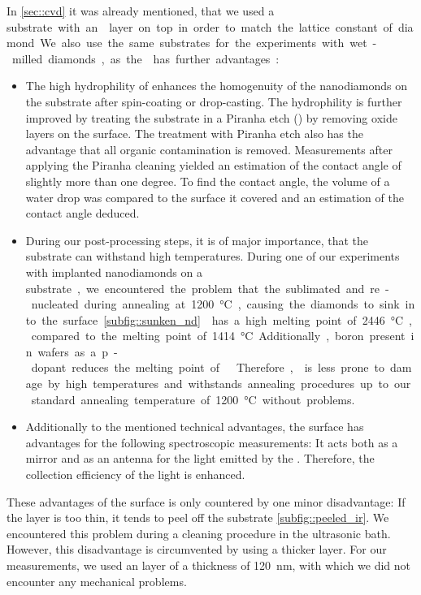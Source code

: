 	In \autoref{sec::cvd} it was already mentioned, that we used a \si substrate with an \ir layer on top in order to match the lattice constant of diamond.
	We also use the same substrates for the experiments with wet-milled diamonds, as the \ir has further advantages:
	\begin{itemize}
		\item The high hydrophility of \ir {} enhances the homogenuity of the nanodiamonds on the substrate after spin-coating or drop-casting. 
		The hydrophility is further improved by treating the substrate in a Piranha etch () by removing oxide layers on the surface. 
		The treatment with Piranha etch also has the advantage that all organic contamination is removed.
		Measurements after applying the Piranha cleaning yielded an estimation of the contact angle of slightly more than one degree.
		To find the contact angle, the volume of a water drop was compared to the surface it covered and an estimation of the contact angle deduced.
		\item During our post-processing steps, it is of major importance, that the substrate can withstand high temperatures.
		During one of our experiments with implanted nanodiamonds on a \si substrate, we encountered the problem that the \si sublimated and re-nucleated during annealing at \SI{1200}{\celsius}, causing the diamonds to sink into the \si surface \ref{subfig::sunken_nd}.
		\Ir has a high melting point of \SI{2446}{\celsius}, compared to the melting point of \SI{1414}{\celsius}.
		Additionally, boron present in \si wafers as a p-dopant reduces the melting point of .
		Therefore, \ir is less prone to damage by high temperatures and withstands annealing procedures up to our standard annealing temperature of \SI{1200}{\celsius} without problems.
		\item Additionally to the mentioned technical advantages, the \ir surface has advantages for the following spectroscopic measurements: 
		It acts both as a mirror and as an antenna for the \fl light emitted by the \siv \cite{}.
		Therefore, the collection efficiency of the \fl light is enhanced.
	\end{itemize}
	These advantages of the \ir surface is only countered by one minor disadvantage:
	If the \ir layer is too thin, it tends to peel off the substrate \autoref{subfig::peeled_ir}.
	We encountered this problem during a cleaning procedure in the ultrasonic bath.
	However, this disadvantage is circumvented by using a thicker \ir layer.
	For our measurements, we used an \Ir layer of a thickness of \SI{120}{nm}, with which we did not encounter any mechanical problems.